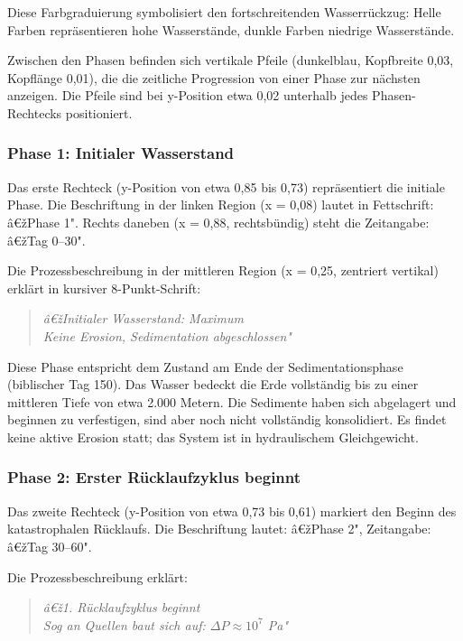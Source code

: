 Diese Farbgraduierung symbolisiert den fortschreitenden Wasserrückzug: Helle Farben repräsentieren hohe Wasserstände, dunkle Farben niedrige Wasserstände.

Zwischen den Phasen befinden sich vertikale Pfeile (dunkelblau, Kopfbreite 0,03, Kopflänge 0,01), die die zeitliche Progression von einer Phase zur nächsten anzeigen. Die Pfeile sind bei y-Position etwa 0,02 unterhalb jedes Phasen-Rechtecks positioniert.

\subsubsection*{Phase 1: Initialer Wasserstand}

Das erste Rechteck (y-Position von etwa 0,85 bis 0,73) repräsentiert die initiale Phase. Die Beschriftung in der linken Region (x = 0,08) lautet in Fettschrift: â€žPhase 1". Rechts daneben (x = 0,88, rechtsbündig) steht die Zeitangabe: â€žTag 0--30".

Die Prozessbeschreibung in der mittleren Region (x = 0,25, zentriert vertikal) erklärt in kursiver 8-Punkt-Schrift:
\begin{quote}
\textit{â€žInitialer Wasserstand: Maximum\\
Keine Erosion, Sedimentation abgeschlossen"}
\end{quote}

Diese Phase entspricht dem Zustand am Ende der Sedimentationsphase (biblischer Tag 150). Das Wasser bedeckt die Erde vollständig bis zu einer mittleren Tiefe von etwa 2.000 Metern. Die Sedimente haben sich abgelagert und beginnen zu verfestigen, sind aber noch nicht vollständig konsolidiert. Es findet keine aktive Erosion statt; das System ist in hydraulischem Gleichgewicht.

\subsubsection*{Phase 2: Erster Rücklaufzyklus beginnt}

Das zweite Rechteck (y-Position von etwa 0,73 bis 0,61) markiert den Beginn des katastrophalen Rücklaufs. Die Beschriftung lautet: â€žPhase 2", Zeitangabe: â€žTag 30--60".

Die Prozessbeschreibung erklärt:
\begin{quote}
\textit{â€ž1. Rücklaufzyklus beginnt\\
Sog an Quellen baut sich auf: $\Delta P \approx 10^7$ Pa"}
\end{quote}

